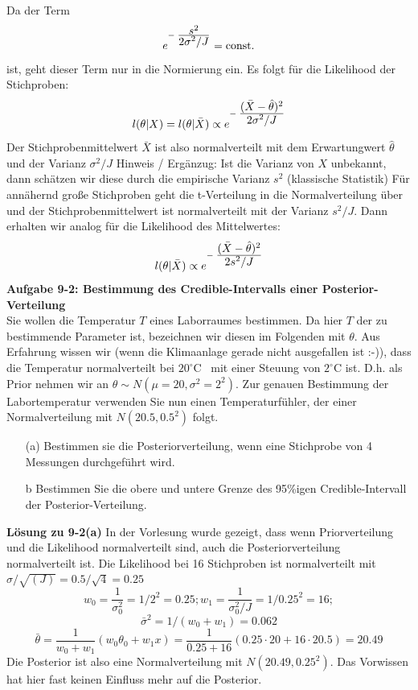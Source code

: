 Da der Term 
\[e^{-\;\frac{\textstyle s^2 }
	{\textstyle 2 \sigma^2/J}} = \mathrm{const.}
\]
ist, geht dieser Term nur in die Normierung ein. 
Es folgt für die Likelihood der Stichproben: 
\[
l(\theta|X) = l(\theta|\bar{X}) \propto e^{-\;\frac{\textstyle (\bar{X} - \hat{\theta})^2} 
	{\textstyle 2 \sigma^2/J}}
\]
Der Stichprobenmittelwert $\bar{X}$ ist also normalverteilt mit dem 
Erwartungwert $\hat{\theta}$ und der Varianz $\sigma^2 /J$
Hinweis / Ergänzug: Ist die Varianz von $X$ unbekannt, dann schätzen wir diese durch die empirische Varianz $s^2$ (klassische Statistik) Für annähernd große Stichproben geht die t-Verteilung in
die Normalverteilung über und der Stichprobenmittelwert ist normalverteilt mit der Varianz $s^2/J$. Dann erhalten wir analog für die Likelihood des Mittelwertes: 
\[
l(\theta|\bar{X}) \propto e^{-\;\frac{\textstyle (\bar{X} - \hat{\theta})^2} 
	{\textstyle 2 s^2/J}}
\]
\textbf{Aufgabe 9-2: Bestimmung des Credible-Intervalls einer Posterior-Verteilung} \\
Sie wollen die Temperatur $T$ eines Laborraumes bestimmen. 
Da hier $T$ der zu bestimmende Parameter ist, bezeichnen 
wir diesen im Folgenden mit $\theta$.
Aus Erfahrung wissen wir (wenn die Klimaanlage gerade nicht ausgefallen ist :-)), dass die Temperatur normalverteilt bei $20^{\circ}\textrm{C}$ \ 
 mit einer Steuung von $2^{\circ}\textrm{C}$ ist. D.h. als Prior nehmen wir an 
$\theta \sim N(\mu=20,\sigma^2=2^2)$. Zur genauen Bestimmung der 
Labortemperatur verwenden Sie nun einen Temperaturfühler, der einer 
Normalverteilung mit $N(20.5,0.5^2)$ folgt. 

\begin{itemize}
   \item[(a)] Bestimmen sie die Posteriorverteilung, wenn eine 
   Stichprobe von 4 Messungen durchgeführt wird.
   \item[b] Bestimmen Sie die obere und untere Grenze des 95\%igen Credible-Intervall der Posterior-Verteilung.
\end{itemize}

\textbf{Lösung zu 9-2(a)}
In der Vorlesung wurde gezeigt, dass wenn Priorverteilung und 
die Likelihood normalverteilt sind, auch die Posteriorverteilung 
normalverteilt ist. 
Die Likelihood bei 16 Stichproben ist normalverteilt mit 
$\sigma/\sqrt{(J)} = 0.5 / \sqrt{4} = 0.25 $
\[
w_0 = \frac{1}{\sigma_0^2} = 1/2^2 = 0.25; 
w_1 = \frac{1}{\sigma_0^2/J} = 1/0.25^2 = 16;
\]
\[
\bar{\sigma}^2 = 1/(w_0 + w_1) = 0.062
\]
\[
\bar{\theta} = \frac{1}{w_0 + w_1} (w_0\theta_0 + w_1 x) = 
\frac{1}{0.25 + 16} (0.25 \cdot 20 + 16 \cdot 20.5) = 20.49
\]
Die Posterior ist also eine Normalverteilung mit $N(20.49,0.25^2)$.
Das Vorwissen hat hier fast keinen Einfluss mehr auf die Posterior.

